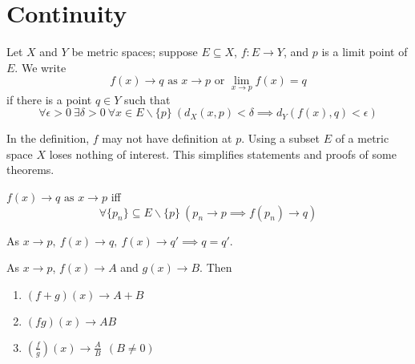 \section{Continuity}
    
    \begin{defi}
        Let $X$ and $Y$ be metric spaces; suppose $E \subseteq X$, $f: E \to Y$, and $p$ is a limit point of $E$. We write 
        \begin{equation}
            f(x) \to q \text{ as } x \to p \text{ or } \lim_{x \to p} f(x) = q
        \end{equation}
        if there is a point $q \in Y$ such that
        \begin{equation}
            \forall \epsilon > 0 \ \exists \delta > 0 \ \forall x \in E \backslash \{p\} \ \left( d_X(x,p) < \delta \implies d_Y(f(x),q) < \epsilon \right)
        \end{equation}
    \end{defi}

    \begin{rem}
        In the definition, $f$ may not have definition at $p$. Using a subset $E$ of a metric space $X$ loses nothing of interest. This simplifies statements and proofs of some theorems.
    \end{rem}

    \begin{theo}
        $f(x) \to q \text{ as } x \to p$ iff
        \begin{equation}
            \forall \{p_n\} \subseteq E \backslash \{p\} \ (p_n \to p \implies f(p_n) \to q)
        \end{equation}
    \end{theo}

    \begin{cor}
        As $x \to p,\ f(x) \to q,\ f(x) \to q' \implies q = q'$.
    \end{cor}

    \begin{theo}
        As $x \to p$, $f(x) \to A$ and $g(x) \to B$. Then
        \begin{enumerate}
            \item $(f+g)(x) \to A+B$
            \item $(fg)(x) \to AB$
            \item $(\frac{f}{g})(x) \to \frac{A}{B} \ \ (B \neq 0)$
        \end{enumerate}
    \end{theo}
    
